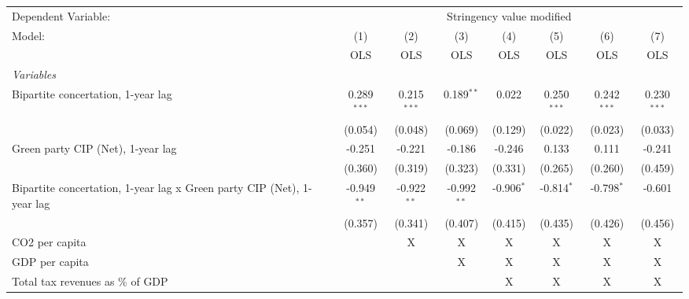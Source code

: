 
\begingroup
\centering
\begin{tabular}{lccccccc}
   \toprule
   Dependent Variable: & \multicolumn{7}{c}{Stringency value modified}\\
   Model:                                                                 & (1)           & (2)           & (3)           & (4)          & (5)           & (6)           & (7)\\  
                                                                          &  OLS          & OLS           & OLS           & OLS          & OLS           & OLS           & OLS\\  
   \midrule
   \emph{Variables}\\
   Bipartite concertation, 1-year lag                                     & 0.289$^{***}$ & 0.215$^{***}$ & 0.189$^{**}$  & 0.022        & 0.250$^{***}$ & 0.242$^{***}$ & 0.230$^{***}$\\   
                                                                          & (0.054)       & (0.048)       & (0.069)       & (0.129)      & (0.022)       & (0.023)       & (0.033)\\   
   Green party CIP (Net), 1-year lag                                      & -0.251        & -0.221        & -0.186        & -0.246       & 0.133         & 0.111         & -0.241\\   
                                                                          & (0.360)       & (0.319)       & (0.323)       & (0.331)      & (0.265)       & (0.260)       & (0.459)\\   
   Bipartite concertation, 1-year lag x Green party CIP (Net), 1-year lag & -0.949$^{**}$ & -0.922$^{**}$ & -0.992$^{**}$ & -0.906$^{*}$ & -0.814$^{*}$  & -0.798$^{*}$  & -0.601\\   
                                                                          & (0.357)       & (0.341)       & (0.407)       & (0.415)      & (0.435)       & (0.426)       & (0.456)\\   
   CO2 per capita                                                         &               & X             & X             & X            & X             & X             & X\\  
   GDP per capita                                                         &               &               & X             & X            & X             & X             & X\\  
   Total tax revenues as \% of GDP                                        &               &               &               & X            & X             & X             & X\\  

\end{tabular}
